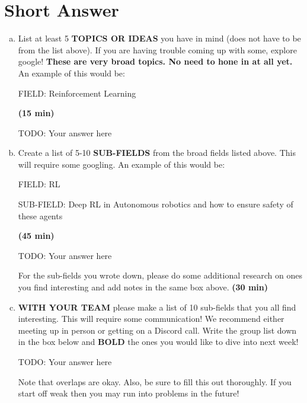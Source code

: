 \documentclass[letterpaper,11pt]{article}
\begin{document}
\section{Short Answer}
\begin{enumerate}[a)]
\item List at least 5 \textbf{TOPICS OR IDEAS} you have in mind (does not have to be from the list above). If you are having trouble coming up with some, explore google! \textbf{These are very broad topics. No need to hone in at all yet.} An example of this would be: 

FIELD: Reinforcement Learning

\textbf{(15 min)}

\begin{tcolorbox}
TODO: Your answer here
\newline
\newline
\newline
\newline
\newline
\end{tcolorbox}

\item Create a list of 5-10 \textbf{SUB-FIELDS} from the broad fields listed above. This will require some googling. An example of this would be: 

FIELD: RL 

SUB-FIELD: Deep RL in Autonomous robotics and how to ensure safety of these agents

\textbf{(45 min)}

\begin{tcolorbox}
TODO: Your answer here
\newline
\newline
\newline
\newline
\newline
\end{tcolorbox}

For the sub-fields you wrote down, please do some additional research on ones you find interesting and add notes in the same box above. \textbf{(30 min)}

\item \textbf{WITH YOUR TEAM} please make a list of 10 sub-fields that you all find interesting. This will require some communication! We recommend either meeting up in person or getting on a Discord call. Write the group list down in the box below and \textbf{BOLD} the ones you would like to dive into next week!

\begin{tcolorbox}
TODO: Your answer here
\newline
\newline
\newline
\newline
\newline
\end{tcolorbox}

Note that overlaps are okay. Also, be sure to fill this out thoroughly. If you start off weak then you may run into problems in the future!
    
\end{enumerate}
\end{document}
